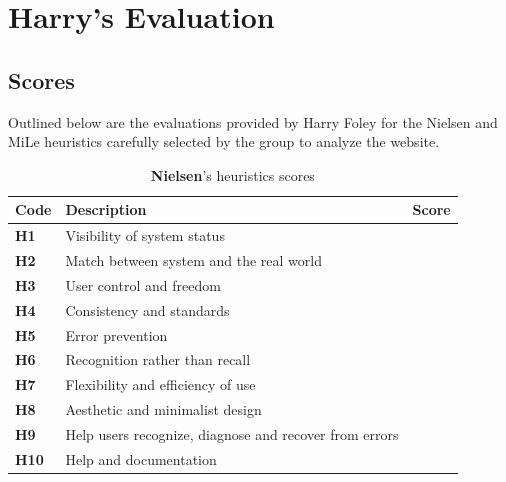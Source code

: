 \section{Harry's Evaluation}
\subsection{Scores}
Outlined below are the evaluations provided by Harry Foley for the Nielsen and MiLe heuristics carefully selected by the group to analyze the website.\\
\begin{table}[htp!]
    \centering
    \begin{tabular}{ |l|l|c| }
        \hline
        \textbf{Code} & \textbf{Description} & \textbf{Score}\\
        \hline
        \textbf{H1} & Visibility of system status & \textbf{\color{unicefRed}{2}}\\
        \hline
        \textbf{H2} & Match between system and the real world & \textbf{\color{unicefGreen}{5}}\\
        \hline
        \textbf{H3} & User control and freedom & \textbf{\color{unicefRed}{3}}\\
        \hline
        \textbf{H4} & Consistency and standards & \textbf{\color{unicefGreen}{5}}\\
        \hline
        \textbf{H5} & Error prevention & \textbf{\color{unicefGreen}{5}}\\
        \hline
        \textbf{H6} & Recognition rather than recall & \textbf{\color{unicefGreen}{4}}\\
        \hline
        \textbf{H7} & Flexibility and efficiency of use & \textbf{\color{unicefRed}{2}}\\
        \hline
        \textbf{H8} & Aesthetic and minimalist design & \textbf{\color{unicefGreen}{4}}\\
        \hline
        \textbf{H9} & Help users recognize, diagnose and recover from errors & \textbf{\color{unicefGreen}{5}}\\
        \hline
        \textbf{H10} & Help and documentation & \textbf{\color{unicefGray}{n.a}}\\
        \hline
    \end{tabular}
    \caption{\textbf{Nielsen}'s heuristics scores}
\end{table}
